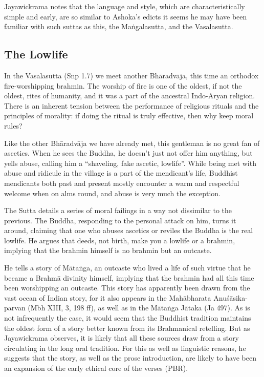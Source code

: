 \documentclass[12pt,openany]{book}%
\begin{document}
Jayawickrama notes that the language and style, which are characteristically simple and early, are so similar to Ashoka’s edicts it seems he may have been familiar with such suttas as this, the \textsanskrit{Maṅgalasutta}, and the Vasalasutta.

\subsection*{The Lowlife}

In the Vasalasutta (Snp 1.7) we meet another \textsanskrit{Bhāradvāja}, this time an orthodox fire-worshipping brahmin. The worship of fire is one of the oldest, if not the oldest, rites of humanity, and it was a part of the ancestral Indo-Aryan religion. There is an inherent tension between the performance of religious rituals and the principles of morality: if doing the ritual is truly effective, then why keep moral rules?

Like the other \textsanskrit{Bhāradvāja} we have already met, this gentleman is no great fan of ascetics. When he sees the Buddha, he doesn’t just not offer him anything, but yells abuse, calling him a “shaveling, fake ascetic, lowlife”. While being met with abuse and ridicule in the village is a part of the mendicant’s life, Buddhist mendicants both past and present mostly encounter a warm and respectful welcome when on alms round, and abuse is very much the exception.

The Sutta details a series of moral failings in a way not dissimilar to the previous. The Buddha, responding to the personal attack on him, turns it around, claiming that one who abuses ascetics or reviles the Buddha is the real lowlife. He argues that deeds, not birth, make you a lowlife or a brahmin, implying that the brahmin himself is no brahmin but an outcaste.

He tells a story of \textsanskrit{Mātaṅga}, an outcaste who lived a life of such virtue that he became a \textsanskrit{Brahmā} divinity himself, implying that the brahmin had all this time been worshipping an outcaste. This story has apparently been drawn from the vast ocean of Indian story, for it also appears in the \textsanskrit{Mahābharata} \textsanskrit{Anuśāsika}-parvan (Mbh XIII, 3, 198 ff), as well as in the \textsanskrit{Mātaṅga} \textsanskrit{Jātaka} (Ja 497). As is not infrequently the case, it would seem that the Buddhist tradition maintains the oldest form of a story better known from its Brahmanical retelling. But as Jayawickrama observes, it is likely that all these sources draw from a story circulating in the long oral tradition. For this as well as linguistic reasons, he suggests that the story, as well as the prose introduction, are likely to have been an expansion of the early ethical core of the verses (PBR).
\end{document}
